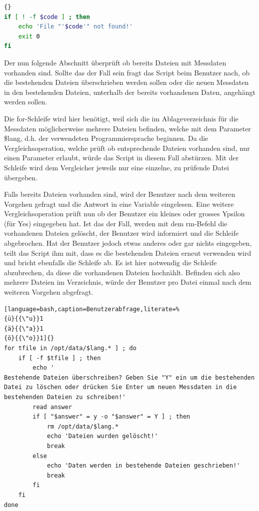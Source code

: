 \documentclass{fancydocument}
\begin{document}
\begin{minipage}{\textwidth}
\begin{lstlisting}[language=bash,caption=Jar-Datei prüfen]{}
if [ ! -f $code ] ; then
	echo 'File "'$code'" not found!'
	exit 0
fi
\end{lstlisting}
\end{minipage}

Der nun folgende Abschnitt überprüft ob bereits Dateien mit Messdaten vorhanden sind. Sollte das der Fall sein fragt das Script beim Benutzer nach, ob die bestehenden Dateien überschrieben werden sollen oder die neuen Messdaten in den bestehenden Dateien, unterhalb der bereits vorhandenen Daten, angehängt werden sollen.

Die for-Schleife wird hier benötigt, weil sich die im Ablageverzeichnis für die Messdaten möglicherweise mehrere Dateien befinden, welche mit dem Parameter \$lang, d.h. der verwendeten Programmiersprache beginnen.  Da die Vergleichsoperation, welche prüft ob entsprechende Dateien vorhanden sind, nur einen Parameter erlaubt, würde das Script in diesem Fall abstürzen. Mit der Schleife wird dem Vergleicher jeweils nur eine einzelne, zu prüfende Datei übergeben.

Falls bereits Dateien vorhanden sind, wird der Benutzer nach dem weiteren Vorgehen gefragt und die Antwort in eine Variable eingelesen. Eine weitere Vergleichsoperation prüft nun ob der Benutzer ein kleines oder grosses Ypsilon (für Yes) eingegeben hat. Ist das der Fall, werden mit dem rm-Befehl die vorhandenen Dateien gelöscht, der Benutzer wird informiert und die Schleife abgebrochen. Hat der Benutzer jedoch etwas anderes oder gar nichts eingegeben, teilt das Script ihm mit, dass es die bestehenden Dateien erneut verwenden wird und bricht ebenfalls die Schleife ab. Es ist hier notwendig die Schleife abzubrechen, da diese die vorhandenen Dateien hochzählt.  Befinden sich also mehrere Dateien im Verzeichnis, würde der Benutzer pro Datei einmal nach dem weiteren Vorgehen abgefragt.

\begin{minipage}{\textwidth}
\begin{lstlisting}[language=bash,caption=Benutzerabfrage,literate=% 
{ü}{{\"u}}1 
{ä}{{\"a}}1 
{ö}{{\"o}}1]{}
for tfile in /opt/data/$lang.* ] ; do
	if [ -f $tfile ] ; then
		echo '
Bestehende Dateien überschreiben? Geben Sie "Y" ein um die bestehenden Datei zu löschen oder drücken Sie Enter um neuen Messdaten in die bestehenden Dateien zu schreiben!'
		read answer
		if [ "$answer" = y -o "$answer" = Y ] ; then
			rm /opt/data/$lang.*
			echo 'Dateien wurden gelöscht!'
			break
		else
			echo 'Daten werden in bestehende Dateien geschrieben!'
			break		
		fi			
	fi
done
\end{lstlisting}
\end{minipage}
\end{document}
